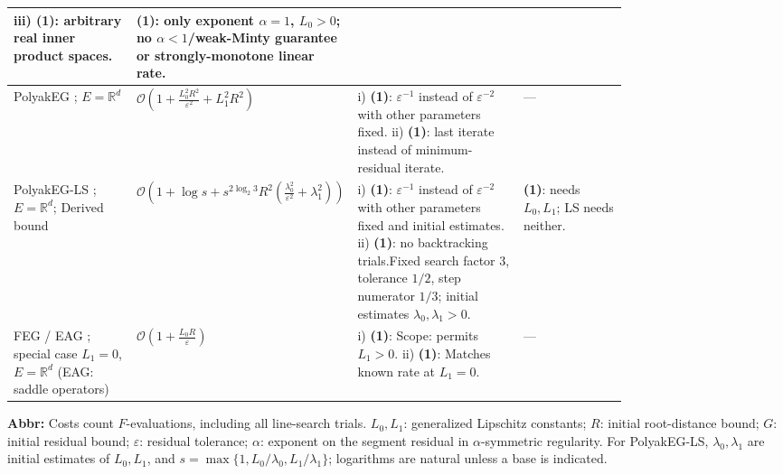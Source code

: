 \begin{table}[tp]
\begin{threeparttable}
\begin{tabularx}{\linewidth}{@{}>{\raggedright\arraybackslash}p{0.20\linewidth}>{\raggedright\arraybackslash}p{0.32\linewidth}>{\raggedright\arraybackslash}p{0.27\linewidth}>{\raggedright\arraybackslash}X@{}}
\newline iii) \textbf{(1)}: arbitrary real inner product spaces.
& \textbf{(1)}: only exponent $\alpha=1$, $L_0>0$; no $\alpha<1$/weak-Minty guarantee or strongly-monotone linear rate. \\
\midrule
PolyakEG \citep[Thm.~3.4, Eq.~(19)]{glmYoonEtAl2026}; $E=\mathbb{R}^d$
& $\mathcal{O}\!\left(1+\frac{L_0^2R^2}{\varepsilon^2}+L_1^2R^2\right)$
& i) \textbf{(1)}: $\varepsilon^{-1}$ instead of $\varepsilon^{-2}$ with other parameters fixed.
\newline ii) \textbf{(1)}: last iterate instead of minimum-residual iterate.
& --- \\
\midrule
PolyakEG-LS \citep[Thm.~3.4, Prop.~3.5]{glmYoonEtAl2026}; $E=\mathbb{R}^d$; Derived bound
& $\mathcal{O}\!\left(1+\log s {}+s^{2\log_2 3}R^2\!\left(\frac{\lambda_0^2}{\varepsilon^2}+\lambda_1^2\right)\right)$\par

& i) \textbf{(1)}: $\varepsilon^{-1}$ instead of $\varepsilon^{-2}$ with other parameters fixed and initial estimates.
\newline ii) \textbf{(1)}: no backtracking trials.\newline Fixed search factor $3$, tolerance $1/2$, step numerator $1/3$; initial estimates $\lambda_0,\lambda_1>0$.
& \textbf{(1)}: needs $L_0,L_1$; LS needs neither. \\
\midrule
FEG / EAG \citep{glmLeeKim2021,glmYoonRyu2021}; special case $L_1=0$, $E=\mathbb{R}^d$ (EAG: saddle operators)
& $\mathcal{O}\!\left(1+\frac{L_0R}{\varepsilon}\right)$
& i) \textbf{(1)}: Scope: permits $L_1>0$.
\newline ii) \textbf{(1)}: Matches known rate at $L_1=0$.
& --- \\
\bottomrule
\end{tabularx}
\begin{tablenotes}[flushleft]\footnotesize
\item[] \textbf{Abbr:} Costs count $F$-evaluations, including all line-search trials. $L_0,L_1$: generalized Lipschitz constants; $R$: initial root-distance bound; $G$: initial residual bound; $\varepsilon$: residual tolerance; $\alpha$: exponent on the segment residual in $\alpha$-symmetric regularity. For PolyakEG-LS, $\lambda_0,\lambda_1$ are initial estimates of $L_0,L_1$, and $s=\max\{1,L_0/\lambda_0,L_1/\lambda_1\}$; logarithms are natural unless a base is indicated.
\end{tablenotes}
\end{threeparttable}
\end{table}
\clearpage
